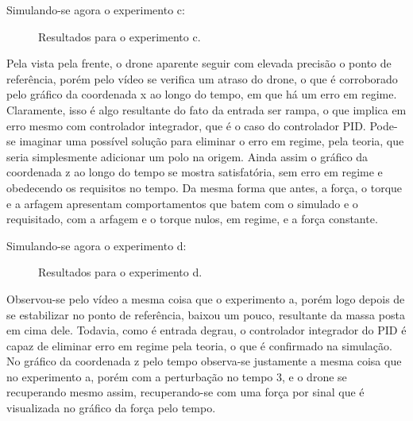 \documentclass[a4paper]{article}
\begin{document}
	Simulando-se agora o experimento c:
	\begin{figure}[H]
		\centering
		\caption{Resultados para o experimento c.}
	\end{figure}
	Pela vista pela frente, o drone aparente seguir com elevada precis\~ao o ponto de
	refer\^encia, por\'em pelo v\'ideo se verifica um atraso do drone, o que \'e corroborado
	pelo gr\'afico da coordenada x ao longo do tempo, em que h\'a um erro em regime. Claramente,
	isso \'e algo resultante do fato da entrada ser rampa, o que implica em erro mesmo com
	controlador integrador, que \'e o caso do controlador PID. Pode-se imaginar uma poss\'ivel
	solu\c{c}\~ao para eliminar o erro em regime, pela teoria, que seria simplesmente adicionar
	um polo na origem. Ainda assim o gr\'afico
	da coordenada z ao longo do tempo se mostra satisfat\'oria, sem erro em regime e obedecendo
	os requisitos no tempo. Da mesma forma que antes, a for\c{c}a, o torque e a arfagem apresentam
	comportamentos que batem com o simulado e o requisitado, com a arfagem e o torque nulos,
	em regime, e a for\c{c}a constante.

	Simulando-se agora o experimento d:
	\begin{figure}[H]
		\centering
		\caption{Resultados para o experimento d.}
	\end{figure}
	Observou-se pelo v\'ideo a mesma coisa que o experimento a, por\'em logo depois de se
	estabilizar no ponto de refer\^encia, baixou um pouco, resultante da massa posta em cima
	dele. Todavia, como \'e entrada degrau, o controlador integrador do PID \'e capaz de
	eliminar erro em regime pela teoria, o que \'e confirmado na simula\c{c}\~ao. No gr\'afico
	da coordenada z pelo tempo observa-se justamente a mesma coisa que no experimento a, por\'em
	com a perturba\c{c}\~ao no tempo 3, e o drone se recuperando mesmo assim, recuperando-se
	com uma for\c{c}a por sinal que \'e visualizada no gr\'afico da for\c{c}a pelo tempo.
\end{document}
